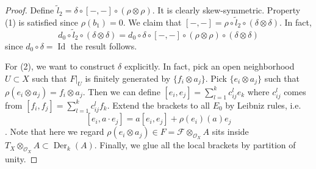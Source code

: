 \documentclass[12pt]{amsart}
\theoremstyle{definition}
\theoremstyle{remark}
\numberwithin{equation}{section}
\newcommand{\CF}{{\mathcal F}}
\newcommand{\CO}{{\mathcal O}}
\newcommand{\1}{{\mathbb{1}}}
\newcommand{\id}{\operatorname{Id}}
\newcommand{\der}{\operatorname{Der}}
\begin{document}
\begin{proof}
	Define $\tilde{l}_2 = \delta \circ [-,-] \circ (\rho\otimes \rho)$. It is clearly skew-symmetric. Property (1) is satisfied since $\rho(b_1) = 0$.
	We claim that $[-,-] = \rho \circ \tilde{l}_2 \circ (\delta \otimes \delta)$. In fact, 
	\begin{equation*}
		d_0 \circ \tilde{l}_2 \circ (\delta \otimes \delta)= d_0\circ \delta \circ [-,-] \circ (\rho\otimes \rho)\circ (\delta \otimes \delta) 
	\end{equation*}
	since $ d_0 \circ \delta = \id$ the result follows. 
	
	
	For (2), we want to construct $\delta$ explicitly. In fact, pick an open neighborhood $U\subset X$ such that $F|_U$ is finitely generated by $\{f_i\otimes a_j\}$. Pick $\{e_i\otimes a_j\}$ such that $\rho{(e_i\otimes a_j)} = f_i\otimes a_j$. Then we can define $[e_i, e_j] = \sum_{l=1}^k c_{ij}^l e_k$ where $c_{ij}^l$ comes from $[f_i, f_j] = \sum_{l=1}^k c_{ij}^l f_k$. Extend the brackets to all $E_0$ by Leibniz rules, i.e.
	$$
	[e_i, a\cdot e_j] = a[e_i, e_j] + \rho(e_i)(a)e_j
	$$. Note that here we regard $\rho(e_i \otimes a_j )\in F = \CF \otimes_{\CO_X} A $ sits inside $T_X\otimes_{\CO_X} A \subset \der_k(A)$. Finally, we glue all the local brackets by partition of unity.
	

\end{proof}
\end{document}
